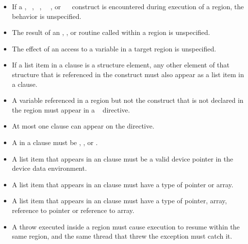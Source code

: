 {{{\restrictions
\begin{itemize}
\item If a , ~, 
~, ~~, or 
~~ construct is encountered during
execution of a  region, the behavior is unspecified.

\item The result of an , 
, or  
routine called within a  region is unspecified.

\item The effect of an access to a  variable in a target region is 
unspecified.

\item If a list item in a  clause is a structure element, any other 
element of that structure that is referenced in the  construct 
must also appear as a list item in a  clause.

\item A variable referenced in a  region but not the  construct that is not 
declared in the  region must appear in a ~ directive. 

\item At most one  clause can appear on the directive.

\item A  in a  clause must be , ,  or .

\item A list item that appears in an  clause must be a valid device pointer in the device data environment.

\cspecificstart
\item A list item that appears in an  clause must have a type of pointer or array.
\cspecificend

\cppspecificstart
\item A list item that appears in an  clause must have a type
  of pointer, array, reference to pointer or reference to array.
\item A throw executed inside a  region must cause execution to resume within the
same  region, and the same thread that threw the exception must catch it. 
\cppspecificend


\end{itemize}}}}
